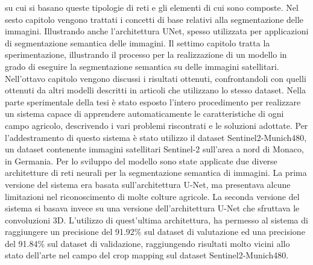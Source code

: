 su cui si basano queste tipologie di reti e gli elementi di cui sono composte. 
Nel sesto capitolo vengono trattati i concetti di base relativi alla segmentazione 
delle immagini. Illustrando anche l'architettura UNet, spesso utilizzata per applicazioni 
di segmentazione semantica delle immagini.
Il settimo capitolo tratta la sperimentazione, illustrando il processo per la realizzazione di 
un modello in grado di eseguire la segmentazione semantica su delle immagini satellitari.
Nell'ottavo capitolo vengono discussi i risultati ottenuti, confrontandoli
con quelli ottenuti da altri modelli descritti in articoli che utilizzano lo stesso dataset.
Nella parte sperimentale della tesi è stato esposto l'intero 
procedimento per realizzare un sistema capace di apprendere 
automaticamente le caratteristiche di ogni campo agricolo, descrivendo i vari problemi riscontrati 
e le soluzioni adottate.
Per l'addestramento di questo sistema è stato utilizzo il dataset Sentinel2-Munich480, 
un dataset contenente immagini satellitari Sentinel-2 sull'area a nord di Monaco, in Germania.
Per lo sviluppo del modello sono state applicate due diverse architetture di reti neurali per la 
segmentazione semantica di immagini.
La prima versione del sistema era 
basata sull'architettura U-Net, ma presentava alcune limitazioni nel riconoscimento di molte colture agricole.
La seconda versione del sistema si basava invece su una versione dell'architettura U-Net che 
sfruttava le convoluzioni 3D. 
L'utilizzo di quest'ultima architettura, ha permesso al sistema di raggiungere un precisione 
del 91.92\% sul dataset di valutazione ed una precisione del 91.84\% sul dataset 
di validazione, raggiungendo risultati molto vicini allo stato dell'arte nel campo del 
crop mapping sul dataset Sentinel2-Munich480.







